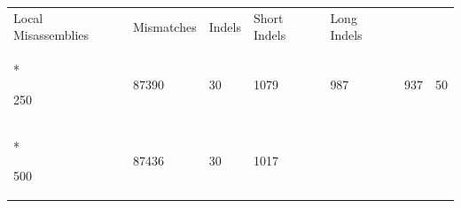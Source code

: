 \documentclass[
  12pt,
  oneside,
  openany]{book}
\begin{document}
\begin{appendices}
\begin{singlespace}
\begin{longtable}[]{@{}lllllll@{}}
\begin{minipage}[b]{0.16\columnwidth}
Local Misassemblies\strut
\end{minipage} & \begin{minipage}[b]{0.11\columnwidth}\raggedright
Mismatches\strut
\end{minipage} & \begin{minipage}[b]{0.07\columnwidth}\raggedright
Indels\strut
\end{minipage} & \begin{minipage}[b]{0.07\columnwidth}\raggedright
Short Indels\strut
\end{minipage} & \begin{minipage}[b]{0.10\columnwidth}\raggedright
Long Indels\strut
\end{minipage}\tabularnewline*
\midrule
\endhead
\begin{minipage}[t]{0.13\columnwidth}\raggedright
250\strut
\end{minipage} & \begin{minipage}[t]{0.16\columnwidth}\raggedright
87390\strut
\end{minipage} & \begin{minipage}[t]{0.16\columnwidth}\raggedright
30\strut
\end{minipage} & \begin{minipage}[t]{0.11\columnwidth}\raggedright
1079\strut
\end{minipage} & \begin{minipage}[t]{0.07\columnwidth}\raggedright
987\strut
\end{minipage} & \begin{minipage}[t]{0.07\columnwidth}\raggedright
937\strut
\end{minipage} & \begin{minipage}[t]{0.10\columnwidth}\raggedright
50\strut
\end{minipage}\tabularnewline*
\begin{minipage}[t]{0.13\columnwidth}\raggedright
500\strut
\end{minipage} & \begin{minipage}[t]{0.16\columnwidth}\raggedright
87436\strut
\end{minipage} & \begin{minipage}[t]{0.16\columnwidth}\raggedright
30\strut
\end{minipage} & \begin{minipage}[t]{0.11\columnwidth}\raggedright
1017\strut
\end{minipage} & \begin{minipage}[t]{0.07\columnwidth}\raggedright

\end{minipage}
\end{longtable}
\end{singlespace}
\end{appendices}
\end{document}
